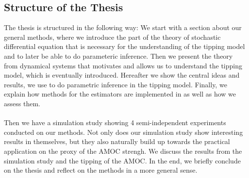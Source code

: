\subsection{Structure of the Thesis}
The thesis is structured in the following way: We start with a section about our general methods, where we  introduce the part of the theory of stochastic differential equation that is necessary for the understanding of the tipping model and to later be able to do parameteric inference. Then we present the theory from dynamical systems that motivates and allows us to understand the tipping model, which is eventually introduced. Hereafter we show the central ideas and results, we use to do parametric inference in the tipping model. Finally, we explain how methods for the estimators are implemented in  as well as how we assess them. \\\\
Then we have a simulation study showing 4 semi-independent experiments conducted on our methods. Not only does our simulation study show interesting results in themselves, but they also naturally build up towards the practical application on the proxy of the AMOC strengh. We discuss the results from the simulation study and the tipping of the AMOC. In the end, we briefly conclude on the thesis and reflect on the methods in a more general sense. 